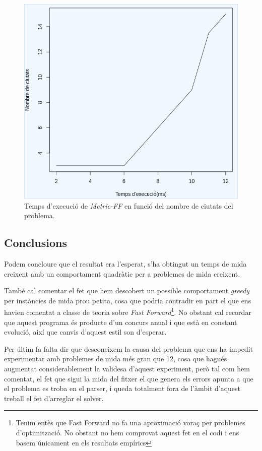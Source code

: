 \documentclass[11pt,a4paper]{article}
\begin{document}
\begin{figure}[hbt]
\includegraphics[width=\textwidth]{./grafic_experiment.png}
\caption{Temps d'execució de \emph{Metric-FF} en funció del nombre de ciutats del problema.}
\label{fig:grafic_experiment}
\end{figure}


\subsection{Conclusions}

Podem concloure que el resultat era l'esperat, s'ha obtingut un temps de mida creixent amb un comportament quadràtic per a problemes de mida creixent.

També cal comentar el fet que hem descobert un possible comportament \emph{greedy} per instàncies de mida prou petita, cosa que podria contradir en part el que ens havien comentat a classe de teoria sobre \emph{Fast Forward}\footnote{Tenim entès que Fast Forward no fa una aproximació voraç per problemes d'optimització. No obstant no hem comprovat aquest fet en el codi i ens basem únicament en els resultats empírics}. No obstant cal recordar que aquest programa és producte d'un concurs anual i que està en constant evolució, així que canvis d'aquest estil son d'esperar.

Per últim fa falta dir que desconeixem la causa del problema que ens ha impedit experimentar amb problemes de mida més gran que 12, cosa que hagués augmentat considerablement la validesa d'aquest experiment, però tal com hem comentat, el fet que sigui la mida del fitxer el que genera els errors apunta a que el problema es troba en el parser, i queda totalment fora de l'àmbit d'aquest treball el fet d'arreglar el solver.
\end{document}
